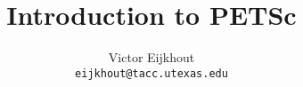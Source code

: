 \documentclass{beamer}
\begin{document}
\title{Introduction to PETSc}
\author{Victor Eijkhout\\ \texttt{eijkhout@tacc.utexas.edu}}
\date{}
\frame{\titlepage}







\begin{details}



\end{details}
\end{document}
